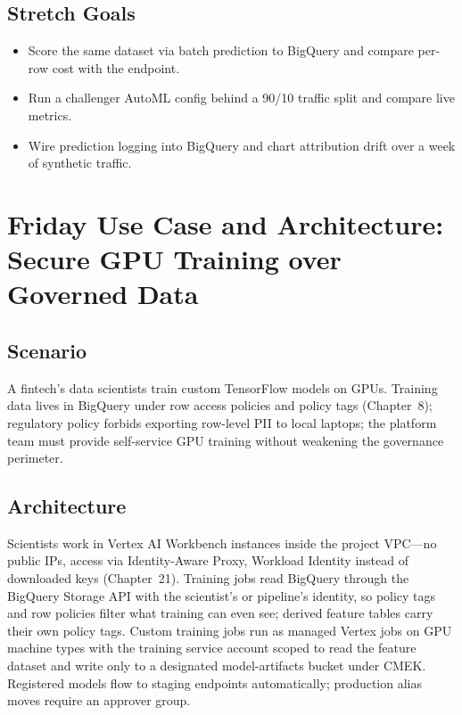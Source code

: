 \subsection*{Stretch Goals}
\begin{itemize}
    \item Score the same dataset via batch prediction to BigQuery and compare per-row cost with the endpoint.
    \item Run a challenger AutoML config behind a 90/10 traffic split and compare live metrics.
    \item Wire prediction logging into BigQuery and chart attribution drift over a week of synthetic traffic.
\end{itemize}

\section{Friday Use Case and Architecture: Secure GPU Training over Governed Data}

\subsection{Scenario}
A fintech's data scientists train custom TensorFlow models on GPUs. Training data lives in BigQuery under row access policies and policy tags (Chapter~8); regulatory policy forbids exporting row-level PII to local laptops; the platform team must provide self-service GPU training without weakening the governance perimeter.

\subsection{Architecture}
Scientists work in Vertex AI Workbench instances inside the project VPC---no public IPs, access via Identity-Aware Proxy, Workload Identity instead of downloaded keys (Chapter~21). Training jobs read BigQuery through the BigQuery Storage API with the scientist's or pipeline's identity, so policy tags and row policies filter what training can even see; derived feature tables carry their own policy tags. Custom training jobs run as managed Vertex jobs on GPU machine types with the training service account scoped to read the feature dataset and write only to a designated model-artifacts bucket under CMEK. Registered models flow to staging endpoints automatically; production alias moves require an approver group.

